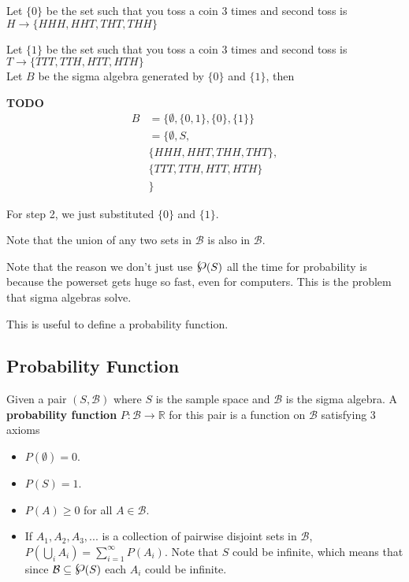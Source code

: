 \documentclass[12pt,letterpaper]{article}
\newcommand{\R}{{\mathbb R}}
\newcommand{\powerset}{\raisebox{.15\baselineskip}{\Large\ensuremath{\wp}}}
\newcommand{\B}{\mathcal B}
\newcommand{\TODO}{\color{red}\textbf{TODO}\color{black}}
\begin{document}
\begin{multicols*}{2}
{            Let $\{0\}$ be the set such that you toss a coin 3 times and second
            toss is $H \rightarrow \{HHH, HHT, THT, THH\}$

            Let $\{1\}$ be the set such that you toss a coin 3 times and second
            toss is $T \rightarrow \{TTT, TTH, HTT, HTH\}$ \\

            Let $B$ be the sigma algebra generated by $\{0\}$ and $\{1\}$, then

            \TODO {Format better}
            \begin{align*}
                B&= \{ \emptyset, \{0, 1\}, \{0\}, \{1\}\} \\
                 &= \{ \emptyset, S, \\
                 &      \{HHH, HHT, THH, THT\}, \\
                 &      \{TTT, TTH, HTT, HTH\} \\
                 &  \}
            \end{align*}

            For step 2, we just substituted $\{0\}$ and $\{1\}$.

            Note that the union of any two sets in $\B$ is also in $\B$. 
        }

        Note that the reason we don't just use $\powerset(S)$ all the time for
        probability is because the powerset gets huge so fast, even for
        computers. This is the problem that sigma algebras solve.

        This is useful to define a probability function. \\

        \subsection{Probability Function}
        Given a pair $(S, \B)$ where $S$ is the sample space and $\B$ is the sigma
        algebra. A {\bf probability function} $P: \B \rightarrow \R$ for this
        pair is a function on $\B$ satisfying 3 axioms

        \begin{itemize}
            \item $P(\emptyset) = 0$.
            \item $P(S) = 1$.
            \item $P(A) \geq 0$ for all $A \in \B$.
            \item If $A_1, A_2, A_3, ...$ is a collection of pairwise disjoint
                sets in $\B$, $P(\bigcup_{i} A_i) = \sum_{i = 1}^{\infty}
                P(A_i)$. Note that $S$ could be infinite, which means that since
                $\B \subseteq \powerset(S)$ each $A_i$ could be infinite.
        \end{itemize}


\end{multicols*}
\end{document}
